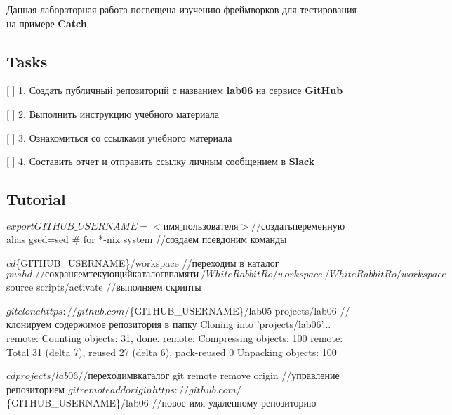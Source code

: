 Данная лабораторная работа посвещена изучению фреймворков для тестирования на примере {\bfseries Catch}




\subsection*{Tasks}


\begin{DoxyItemize}
\item \mbox{[} \mbox{]} 1. Создать публичный репозиторий с названием {\bfseries lab06} на сервисе {\bfseries Git\+Hub}
\item \mbox{[} \mbox{]} 2. Выполнить инструкцию учебного материала
\item \mbox{[} \mbox{]} 3. Ознакомиться со ссылками учебного материала
\item \mbox{[} \mbox{]} 4. Составить отчет и отправить ссылку личным сообщением в {\bfseries Slack}
\end{DoxyItemize}

\subsection*{Tutorial}


\begin{DoxyCode}
$ export GITHUB\_USERNAME=<имя\_пользователя> //создать переменную
$ alias gsed=sed # for *-nix system //создаем псевдоним команды
\end{DoxyCode}



\begin{DoxyCode}
$ cd $\{GITHUB\_USERNAME\}/workspace //переходим в каталог
$ pushd . //сохраняем текующий каталог в памяти
~/WhiteRabbitRo/workspace ~/WhiteRabbitRo/workspace
$ source scripts/activate //выполняем скрипты
\end{DoxyCode}



\begin{DoxyCode}
$ git clone https://github.com/$\{GITHUB\_USERNAME\}/lab05 projects/lab06 //клонируем содержимое репозитория в
       папку
Cloning into 'projects/lab06'...
remote: Counting objects: 31, done.
remote: Compressing objects: 100%
remote: Total 31 (delta 7), reused 27 (delta 6), pack-reused 0
Unpacking objects: 100%

$ cd projects/lab06 //переходим в каталог
$ git remote remove origin //управление репозиторием
$ git remote add origin https://github.com/$\{GITHUB\_USERNAME\}/lab06 //новое имя удаленному репозиторию
\end{DoxyCode}



